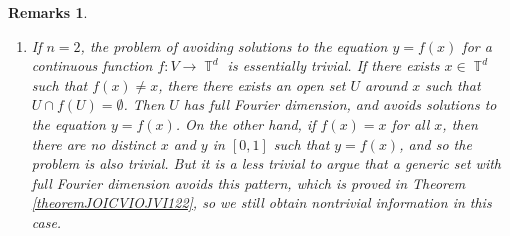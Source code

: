 \documentclass[dvipsnames,letterpaper,12pt]{article}
\numberwithin{equation}{section}
\DeclareMathOperator{\RR}{\mathbb{R}}
\DeclareMathOperator{\TT}{\mathbb{T}}
\newtheorem{remarks}[theorem]{Remarks}
\numberwithin{theorem}{section}
\begin{document}
\begin{remarks}
\begin{enumerate}
        \item If $n = 2$, the problem of avoiding solutions to the equation $y = f(x)$ for a continuous function $f: V \to \TT^d$ is essentially trivial. If there exists $x \in \TT^d$ such that $f(x) \neq x$, there there exists an open set $U$ around $x$ such that $U \cap f(U) = \emptyset$. Then $U$ has full Fourier dimension, and avoids solutions to the equation $y = f(x)$. On the other hand, if $f(x) = x$ for all $x$, then there are no distinct $x$ and $y$ in $[0,1]$ such that $y = f(x)$, and so the problem is also trivial. But it is a less trivial to argue that a \emph{generic} set with full Fourier dimension avoids this pattern, which is proved in Theorem \ref{theoremJOICVIOJVI122}, so we still obtain nontrivial information in this case.
    \end{enumerate}
\end{remarks}

\end{document}
